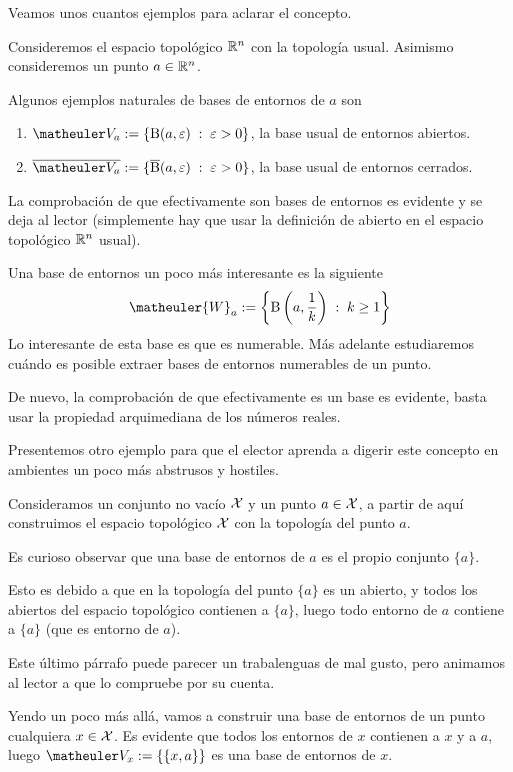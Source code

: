 Veamos unos cuantos ejemplos para aclarar el concepto.
\begin{exa}
	\label{etop_exa_baseUsual}
	Consideremos el espacio topológico $\mathbb{R}^n$ con la topología usual. Asimismo consideremos un punto $a\in\mathbb{R}^n$.
	
	Algunos ejemplos naturales de bases de entornos de $a$ son
	\begin{enumerate}
		\item $\Va{a}:=\{\bola(a,\varepsilon)\midc \varepsilon>0\}$, la base usual de entornos abiertos.
		\item $\adher{\Va{a}}:=\{\adher{\bola}(a,\varepsilon)\midc \varepsilon>0\}$, la base usual de entornos cerrados.
	\end{enumerate}
	La comprobación de que efectivamente son bases de entornos es evidente y se deja al lector (simplemente hay que usar la definición de abierto en el espacio topológico $\mathbb{R}^n$ usual).
	
	Una base de entornos un poco más interesante es la siguiente
	\begin{equation}
		\matheuler{W}_a:=\left\{\bola\left(a,\frac{1}{k}\right)\midc k\geq 1\right\}
	\end{equation}
	Lo interesante de esta base es que es numerable. Más adelante estudiaremos cuándo es posible extraer bases de entornos numerables de un punto.
	
	De nuevo, la comprobación de que efectivamente es un base es evidente, basta usar la propiedad arquimediana de los números reales.
\end{exa}

Presentemos otro ejemplo para que el elector aprenda a digerir este concepto en ambientes un poco más abstrusos y hostiles.
\begin{exa}
	\label{etop_exa_basePunto}
	Consideramos un conjunto no vacío $\mathcal{X}$ y un punto $a\in \mathcal{X}$, a partir de aquí construimos el espacio topológico $\mathcal{X}$ con la topología del punto $a$.
	
	Es curioso observar que una base de entornos de $a$ es el propio conjunto $\{a\}$.
	
	Esto es debido a que en la topología del punto $\{a\}$ es un abierto, y todos los abiertos del espacio topológico contienen a $\{a\}$, luego todo entorno de $a$ contiene a $\{a\}$ (que es entorno de $a$).
	
	Este último párrafo puede parecer un trabalenguas de mal gusto, pero animamos al lector a que lo compruebe por su cuenta.
	
	Yendo un poco más allá, vamos a construir una base de entornos de un punto cualquiera $x\in\mathcal{X}$. Es evidente que todos los entornos de $x$ contienen a $x$ y a $a$, luego $\Va{x}:=\{\{x,a\}\}$ es una base de entornos de $x$.
\end{exa}

